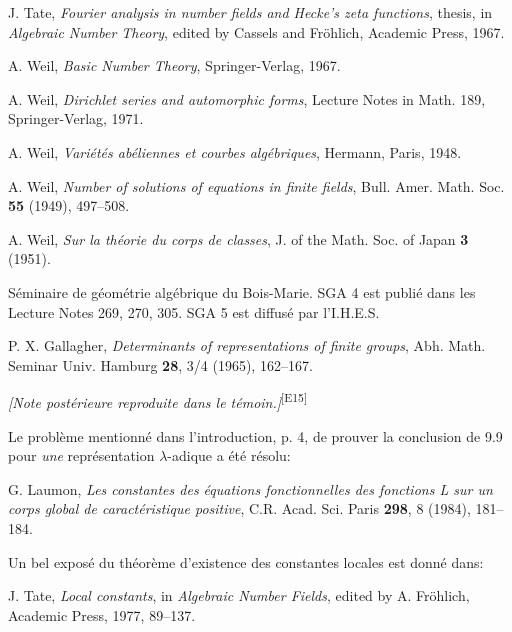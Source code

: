 \documentclass[10pt,letterpaper]{article}
\newcommand{\auditmark}[1]{\textsuperscript{\normalfont\scriptsize[E#1]}}
\begin{document}
\begin{enumerate}[label={[\arabic*]},leftmargin=2.8em]
\item J. Tate, \emph{Fourier analysis in number fields and Hecke's zeta functions}, thesis, in \emph{Algebraic Number Theory}, edited by Cassels and Fröhlich, Academic Press, 1967.
\item A. Weil, \emph{Basic Number Theory}, Springer-Verlag, 1967.
\item A. Weil, \emph{Dirichlet series and automorphic forms}, Lecture Notes in Math. 189, Springer-Verlag, 1971.
\item A. Weil, \emph{Variétés abéliennes et courbes algébriques}, Hermann, Paris, 1948.
\item A. Weil, \emph{Number of solutions of equations in finite fields}, Bull. Amer. Math. Soc. \textbf{55} (1949), 497--508.
\item A. Weil, \emph{Sur la théorie du corps de classes}, J. of the Math. Soc. of Japan \textbf{3} (1951).
\item[SGA] Séminaire de géométrie algébrique du Bois-Marie. SGA 4 est publié dans les Lecture Notes 269, 270, 305. SGA 5 est diffusé par l'I.H.E.S.
\item P. X. Gallagher, \emph{Determinants of representations of finite groups}, Abh. Math. Seminar Univ. Hamburg \textbf{28}, 3/4 (1965), 162--167.
\end{enumerate}

\medskip
\noindent\textit{[Note postérieure reproduite dans le témoin.]}\auditmark{15}

\noindent Le problème mentionné dans l'introduction, p. 4, de prouver la conclusion de 9.9 pour \emph{une} représentation \(\lambda\)-adique a été résolu:

\noindent G. Laumon, \emph{Les constantes des équations fonctionnelles des fonctions L sur un corps global de caractéristique positive}, C.R. Acad. Sci. Paris \textbf{298}, 8 (1984), 181--184.

\medskip
\noindent Un bel exposé du théorème d'existence des constantes locales est donné dans:

\noindent J. Tate, \emph{Local constants}, in \emph{Algebraic Number Fields}, edited by A. Fröhlich, Academic Press, 1977, 89--137.




\begingroup
\fontsize{10pt}{11pt}\selectfont
\setlength{\parskip}{0pt}
\setlength{\abovedisplayskip}{6pt plus 2pt minus 2pt}
\setlength{\belowdisplayskip}{6pt plus 2pt minus 2pt}
\clearpage
\end{document}
